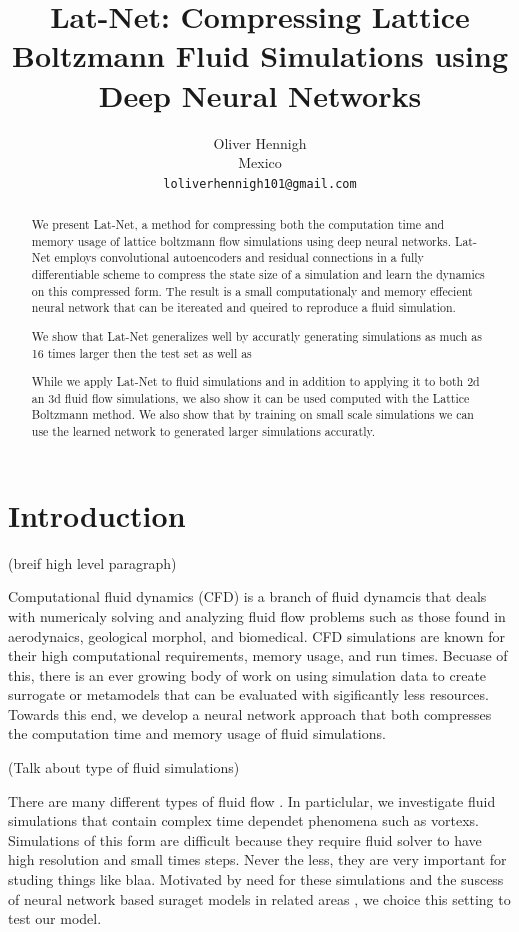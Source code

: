 \documentclass{article}
\title{Lat-Net: Compressing Lattice Boltzmann Fluid Simulations using Deep Neural Networks}
\author{
  Oliver Hennigh \\
  Mexico \\
  \texttt{loliverhennigh101@gmail.com} \\
}
\begin{document}

\maketitle

\begin{abstract}
We present Lat-Net, a method for compressing both the computation time and memory usage of lattice boltzmann flow simulations using deep neural networks. Lat-Net employs convolutional autoencoders and residual connections in a fully differentiable scheme to compress the state size of a simulation and learn the dynamics on this compressed form. The result is a small computationaly and memory effecient neural network that can be itereated and queired to reproduce a fluid simulation. 

We show that Lat-Net generalizes well by accuratly generating simulations as much as 16 times larger then the test set as well as 

While we apply Lat-Net to fluid simulations   and in addition to applying it to both 2d an 3d fluid flow simulations, we also show it can be used  computed with the Lattice Boltzmann method. We also show that by training on small scale simulations we can use the learned network to generated larger simulations accuratly.

\end{abstract}

\section{Introduction}

(breif high level paragraph)

Computational fluid dynamics (CFD) is a branch of fluid dynamcis that deals with numericaly solving and analyzing fluid flow problems such as those found in aerodynaics, geological morphol, and biomedical. CFD simulations are known for their high computational requirements, memory usage, and run times. Becuase of this, there is an ever growing body of work on using simulation data to create surrogate or metamodels that can be evaluated with sigificantly less resources. Towards this end, we develop a neural network approach that both compresses the computation time and memory usage of fluid simulations.

(Talk about type of fluid simulations)

There are many different types of fluid flow . In particlular, we investigate fluid simulations that contain complex time dependet phenomena such as vortexs. Simulations of this form are difficult because they require fluid solver to have high resolution and small times steps. Never the less, they are very important for studing things like blaa. Motivated by need for these simulations and the suscess of neural network based suraget models in related areas \cite{tompson2016accelerating} \cite{guo2016convolutional}, we choice this setting to test our model.
\end{document}
